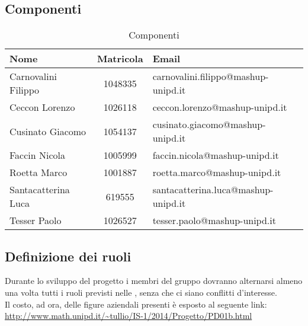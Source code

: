 	\subsection{Componenti} %
	\label{sub:componenti}
		\begin{table}[!h]
			\begin{center}
				\begin{tabularx}{0.95\textwidth}{|l|c|X|}
					\hline
					\textbf{Nome} & \textbf{Matricola} & \textbf{Email} \\
					\hline
					Carnovalini Filippo &
					1048335 &
					carnovalini.filippo@mashup-unipd.it  \\
					\hline
			
					Ceccon Lorenzo &
					1026118 &
					ceccon.lorenzo@mashup-unipd.it \\
					\hline
			
					Cusinato Giacomo &
					1054137 &
					cusinato.giacomo@mashup-unipd.it \\
					\hline
			
					Faccin Nicola &
					1005999 &
					faccin.nicola@mashup-unipd.it \\
					\hline
			
					Roetta Marco &
					1001887 &
					roetta.marco@mashup-unipd.it \\
					\hline
			
					Santacatterina Luca &
				 	619555 &
					santacatterina.luca@mashup-unipd.it \\
					\hline
			
					Tesser Paolo &
					1026527 &
					tesser.paolo@mashup-unipd.it \\
					\hline					
				\end{tabularx}	
			\end{center}
		\caption{Componenti}
		\end{table}

	\subsection{Definizione dei ruoli} %
	\label{sub:definizione_dei_ruoli}
	Durante lo sviluppo del progetto i membri del gruppo dovranno alternarsi almeno una volta tutti i ruoli previsti nelle \docNameVersionNdP{}, senza che ci siano conflitti d'interesse. \\
	Il costo, ad ora, delle figure aziendali presenti è esposto al seguente link: \\
	\url{http://www.math.unipd.it/~tullio/IS-1/2014/Progetto/PD01b.html}

